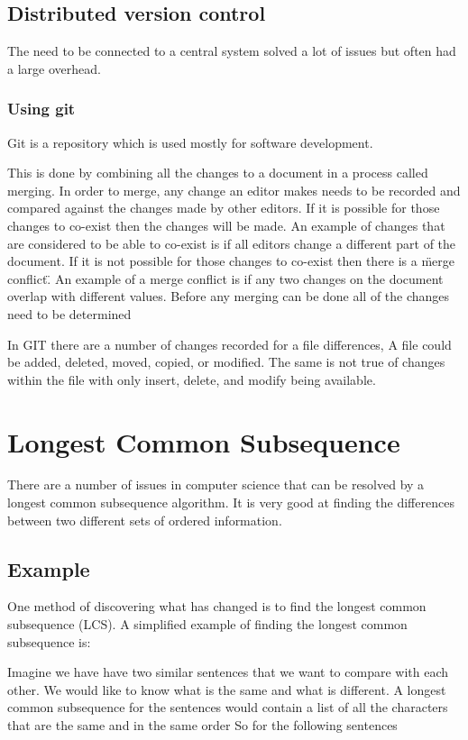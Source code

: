 \subsection{Distributed version control}
The need to be connected to a central system solved a lot of issues but often had a large overhead.  



\subsubsection{Using git}
Git is a repository which is used mostly for software development.

This is done by combining all the changes to a document in a process called merging. 
In order to merge, any change an editor makes needs to be recorded and compared against the changes made by other editors.
If it is possible for those changes to co-exist then the changes will be made.
An example of changes that are considered to be able to co-exist is if all editors change a different part of the document.
If it is not possible for those changes to co-exist then there is a \"merge conflict\".
An example of a merge conflict is if any two changes on the document overlap with different values.
Before any merging can be done all of the changes need to be determined

In GIT there are a number of changes recorded for a file differences,  A file could be added, deleted, moved, copied, or modified.  The same is not true of changes within the file with only insert, delete, and modify being available.

\section{Longest Common Subsequence}
There are a number of issues in computer science that can be resolved by a longest common subsequence algorithm.
It is very good at finding the differences between two different sets of ordered information.


\subsection{Example}
One method of discovering what has changed is to find the longest common subsequence (LCS).
A simplified example of finding the longest common subsequence is:

Imagine we have have two similar sentences that we want to compare with each other.  
We would like to know what is the same and what is different.
A longest common subsequence for the sentences would contain a list of all the characters that are the same and in the same order
So for the following sentences

